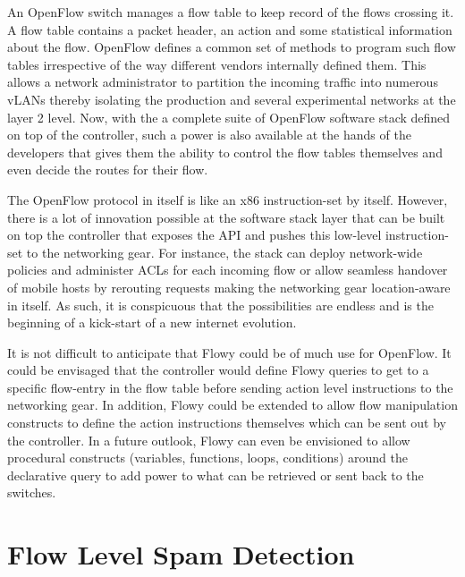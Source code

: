 An OpenFlow switch manages a flow table to keep record of the flows crossing it. A flow table contains a packet header, an action and some statistical information about the flow. OpenFlow defines a common set of methods to program such  flow tables irrespective of the way different vendors internally defined them. This allows a network administrator to partition the incoming traffic into numerous \ac{vLANs} thereby isolating the production and several experimental networks at the layer 2 level. Now, with the a complete suite of OpenFlow software stack defined on top of the controller, such a power is also available at the hands of the developers that gives them the ability to control the flow tables themselves and even decide the routes for their flow.

The OpenFlow protocol in itself is like an x$86$ instruction-set by itself. However, there is a lot of innovation possible at the software stack layer that can be built on top the controller that exposes the API and pushes this low-level instruction-set to the networking gear. For instance, the stack can deploy  network-wide policies and administer \ac{ACLs} for each incoming flow or  allow seamless handover of mobile hosts by rerouting requests making the networking gear location-aware in itself. As such, it is conspicuous that the possibilities are endless and is the beginning of a kick-start of a new internet evolution.

It is not difficult to anticipate that Flowy could be of much use for OpenFlow. It could be envisaged that the controller would define Flowy queries to get to a specific flow-entry in the flow table before sending action level instructions to the networking gear.  In addition, Flowy could be extended to allow flow manipulation constructs to define the action instructions themselves which can be sent out by the controller. In a future outlook, Flowy can even be envisioned to allow procedural constructs (variables, functions, loops, conditions) around the declarative query to add power to what can be retrieved or sent back to the switches.

\section{Flow Level Spam Detection}\label{sec:spam-detection}


